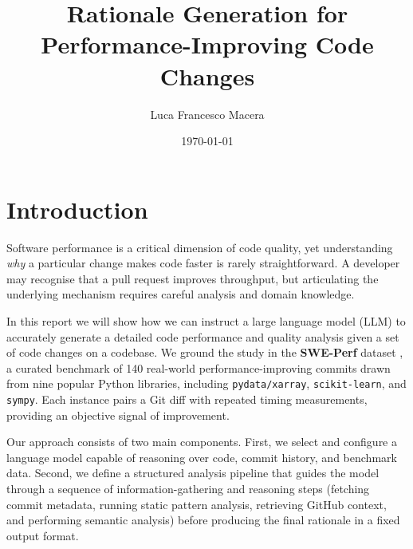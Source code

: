 \documentclass[12pt, a4paper]{article}
\title{Rationale Generation for Performance-Improving Code Changes}
\author{Luca Francesco Macera}
\date{\today}
\begin{document}
\maketitle
\tableofcontents
\newpage

\section{Introduction}
\label{sec:introduction}

Software performance is a critical dimension of code quality, yet understanding \emph{why} a particular change makes code faster is rarely straightforward.
A developer may recognise that a pull request improves throughput, but articulating the underlying mechanism requires careful analysis and domain knowledge.

In this report we will show how we can instruct a large language model (LLM) to accurately generate a detailed code performance and quality analysis given a set of code changes on a codebase.
We ground the study in the \textbf{SWE-Perf} dataset \cite{sweperf}, a curated benchmark of 140 real-world performance-improving commits drawn from nine popular Python libraries, including \texttt{pydata/xarray}, \texttt{scikit-learn}, and \texttt{sympy}.
Each instance pairs a Git diff with repeated timing measurements, providing an objective signal of improvement.

Our approach consists of two main components.
First, we select and configure a language model capable of reasoning over code, commit history, and benchmark data.
Second, we define a structured analysis pipeline that guides the model through a sequence of information-gathering and reasoning steps (fetching commit metadata, running static pattern analysis, retrieving GitHub context, and performing semantic analysis) before producing the final rationale in a fixed output format.
\end{document}
